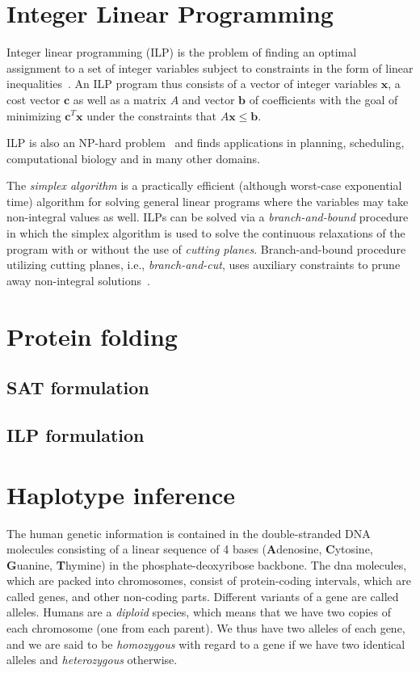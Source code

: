 \documentclass[12pt,a4paper]{article}
\begin{document}
\section{Integer Linear Programming}
Integer linear programming (ILP) is the problem of finding an optimal assignment to a set of integer variables subject to constraints in the form of linear inequalities~\cite{DBLP:books/ph/PapadimitriouS82}.
An ILP program thus consists of a vector of integer variables $\mathbf{x}$, a cost vector $\mathbf{c}$ as well as a matrix $A$ and vector $\mathbf{b}$ of coefficients with the goal of minimizing $\mathbf{c}^T \mathbf{x}$ under the constraints that $A\mathbf{x} \leq \mathbf{b}$.

ILP is also an NP-hard problem~\cite{DBLP:conf/coco/Karp72} and finds applications in planning, scheduling, computational biology and in many other domains.

The \emph{simplex algorithm} is a practically efficient (although worst-case exponential time) algorithm for solving general linear programs where the variables may take non-integral values as well.
ILPs can be solved via a \emph{branch-and-bound} procedure in which the simplex algorithm is used to solve the continuous relaxations of the program with or without the use of \emph{cutting planes}.
Branch-and-bound procedure utilizing cutting planes, i.e., \emph{branch-and-cut}, uses auxiliary constraints to prune away non-integral solutions~\cite{DBLP:books/ph/PapadimitriouS82}.


\section{Protein folding}


\subsection{SAT formulation}

\subsection{ILP formulation}


\section{Haplotype inference}
The human genetic information is contained in the double-stranded DNA molecules consisting of a linear sequence of 4 bases (\textbf{A}denosine, \textbf{C}ytosine, \textbf{G}uanine, \textbf{T}hymine) in the phosphate-deoxyribose backbone.
The dna molecules, which are packed into chromosomes, consist of protein-coding intervals, which are called genes, and other non-coding parts.
Different variants of a gene are called alleles.
Humans are a \emph{diploid} species, which means that we have two copies of each chromosome (one from each parent).
We thus have two alleles of each gene, and we are said to be \emph{homozygous} with regard to a gene if we have two identical alleles and \emph{heterozygous} otherwise.
\end{document}
